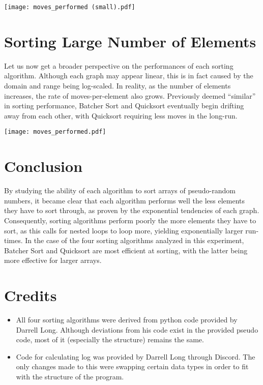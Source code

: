 \documentclass[12pt]{article}
\begin{document}
\texttt{[image: moves\_performed (small).pdf]}

\section{Sorting Large Number of Elements}

Let us now get a broader perspective on the performances of each sorting algorithm. Although each graph may appear linear, this is in fact caused by the domain and range being log-scaled. In reality, as the number of elements increases, the rate of moves-per-element also grows. Previously deemed \enquote{similar} in sorting performance, Batcher Sort and Quicksort eventually begin drifting away from each other, with Quicksort requiring less moves in the long-run.

\vspace{0.2in}

\texttt{[image: moves\_performed.pdf]}

\section{Conclusion}

By studying the ability of each algorithm to sort arrays of pseudo-random numbers, it became clear that each algorithm performs well the less elements they have to sort through, as proven by the exponential tendencies of each graph. Consequently, sorting algorithms perform poorly the more elements they have to sort, as this calls for nested loops to loop more, yielding exponentially larger run-times. In the case of the four sorting algorithms analyzed in this experiment, Batcher Sort and Quicksort are most efficient at sorting, with the latter being more effective for larger arrays.

\section{Credits}

\begin{itemize}
\item All four sorting algorithms were derived from python code provided by Darrell Long. Although deviations from his code exist in the provided pseudo code, most of it (especially the structure) remains the same.

\item Code for calculating log was provided by Darrell Long through Discord. The only changes made to this were swapping certain data types in order to fit with the structure of the program.

\end{itemize}
\end{document}

